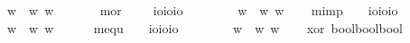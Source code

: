 \begin{isabellebody}
\ \ \ \ \ {\isachardoublequoteopen}{\isasymphi}\isactrlbold {\isasymand}{\isasympsi}\ {\isasymequiv}\ {\isasymlambda}w{\isachardot}\ {\isacharparenleft}{\isasymphi}\ w{\isacharparenright}{\isasymand}{\isacharparenleft}{\isasympsi}\ w{\isacharparenright}{\isachardoublequoteclose}\ \ \ \isanewline
\ \ \isamarkupfalse%
\ mor\ \ \ \ {\isacharcolon}{\isacharcolon}\ {\isachardoublequoteopen}io{\isasymRightarrow}io{\isasymRightarrow}io{\isachardoublequoteclose}\ {\isacharparenleft}\isanewline
\ \ \ \ \ {\isachardoublequoteopen}{\isasymphi}\isactrlbold {\isasymor}{\isasympsi}\ {\isasymequiv}\ {\isasymlambda}w{\isachardot}\ {\isacharparenleft}{\isasymphi}\ w{\isacharparenright}{\isasymor}{\isacharparenleft}{\isasympsi}\ w{\isacharparenright}{\isachardoublequoteclose}\isanewline
\ \ \isamarkupfalse%
\ mimp\ \ \ {\isacharcolon}{\isacharcolon}\ {\isachardoublequoteopen}io{\isasymRightarrow}io{\isasymRightarrow}io{\isachardoublequoteclose}\ {\isacharparenleft}\ \isanewline
\ \ \ \ \ {\isachardoublequoteopen}{\isasymphi}\isactrlbold {\isasymrightarrow}{\isasympsi}\ {\isasymequiv}\ {\isasymlambda}w{\isachardot}\ {\isacharparenleft}{\isasymphi}\ w{\isacharparenright}{\isasymlongrightarrow}{\isacharparenleft}{\isasympsi}\ w{\isacharparenright}{\isachardoublequoteclose}\ \ \isanewline
\ \ \isamarkupfalse%
\ mequ\ \ \ {\isacharcolon}{\isacharcolon}\ {\isachardoublequoteopen}io{\isasymRightarrow}io{\isasymRightarrow}io{\isachardoublequoteclose}\ {\isacharparenleft}\isanewline
\ \ \ \ \ {\isachardoublequoteopen}{\isasymphi}\isactrlbold {\isasymleftrightarrow}{\isasympsi}\ {\isasymequiv}\ {\isasymlambda}w{\isachardot}\ {\isacharparenleft}{\isasymphi}\ w{\isacharparenright}{\isasymlongleftrightarrow}{\isacharparenleft}{\isasympsi}\ w{\isacharparenright}{\isachardoublequoteclose}\isanewline
\ \ \isamarkupfalse%
\ xor{\isacharcolon}{\isacharcolon}\ {\isachardoublequoteopen}bool{\isasymRightarrow}bool{\isasymRightarrow}bool{\isachardoublequoteclose}\ {\isacharparenleft}\isanewline

\end{isabellebody}
